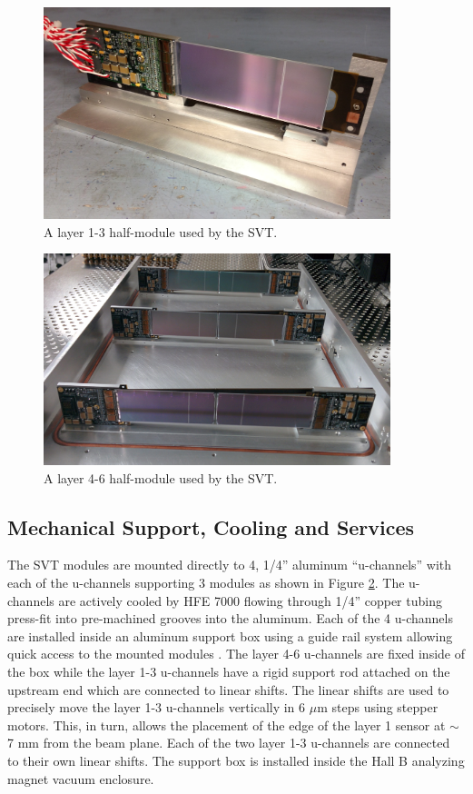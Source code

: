 \begin{figure}
    \centering
    \includegraphics[width=0.9\textwidth]{images/l13_half_module.jpg}
    \caption{A layer 1-3 half-module used by the SVT. }
    \label{fig:l13_hm}
\end{figure}
\begin{figure}
    \centering
    \includegraphics[width=0.9\textwidth]{images/l46_half_module.jpg}
    \caption{A layer 4-6 half-module used by the SVT. }
    \label{fig:l46_hm}
\end{figure}


\subsection{Mechanical Support, Cooling and Services}

The SVT modules are mounted directly to 4,  1/4'' aluminum ``u-channels'' with each
of the u-channels supporting 3 modules as shown in Figure \ref{fig:l46_hm}.  
The u-channels are actively cooled by HFE 7000 flowing through 1/4'' copper 
tubing press-fit into pre-machined grooves into the aluminum. Each of the 4 
u-channels are installed inside an aluminum support box using a guide rail system
allowing quick access to the mounted modules 
.  The layer 
4-6 u-channels are fixed inside of the box while the layer 1-3 u-channels 
have a rigid support rod attached on the upstream end which are connected to 
linear shifts. The linear shifts are used to precisely move the layer 1-3 
u-channels vertically in 6 $\mu$m steps using stepper motors.  This, in turn, 
allows the placement of the edge of the layer 1 sensor at $\sim$ 7 mm from the 
beam plane.  Each of the two layer 1-3 u-channels are connected to their own 
linear shifts.  The support box is installed inside the Hall B analyzing magnet 
vacuum enclosure. 

